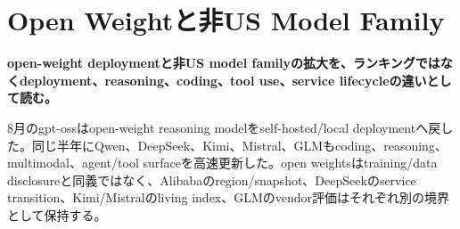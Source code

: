 \section{Open Weightと非US Model Family}
\noindent\textbf{open-weight deploymentと非US model familyの拡大を、ランキングではなくdeployment、reasoning、coding、tool use、service lifecycleの違いとして読む。}\autocite{src-12865e8612c7,src-1c46fdf17c79}

8月のgpt-ossはopen-weight reasoning modelをself-hosted/local deploymentへ戻した。同じ半年にQwen、DeepSeek、Kimi、Mistral、GLMもcoding、reasoning、multimodal、agent/tool surfaceを高速更新した。open weightsはtraining/data disclosureと同義ではなく、Alibabaのregion/snapshot、DeepSeekのservice transition、Kimi/Mistralのliving index、GLMのvendor評価はそれぞれ別の境界として保持する。\autocite{src-12865e8612c7,src-1c46fdf17c79,src-9156c37fb1c2,src-9191d43918fc,src-d8b7c1c36830,src-e547d0d8cbe3,src-eac8dfbeb78c}
